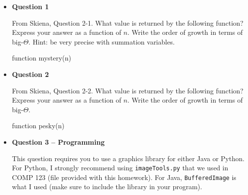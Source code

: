 \documentclass{article}
\begin{document}
\begin{itemize}
    \item\textbf{ Question 1}


          From Skiena, Question 2-1.  What value is returned by the following function?  Express your answer as a function of $n$.  Write the order of growth in terms of big-$\Theta$. Hint: be very precise with summation variables.

          \begin{algorithm}
              \begin{algorithmic}

                  \ENDFOR
                  \ENDFOR
                  \ENDFOR
              \end{algorithmic}
              \caption{function mystery(n) }
              \label{alg:algo}
          \end{algorithm}

    \item \textbf{Question 2}


          From Skiena, Question 2-2.  What value is returned by the following function?  Express your answer as a function of $n$.  Write the order of growth in terms of big-$\Theta$.
          \begin{algorithm}
              \begin{algorithmic}

                  \ENDFOR
                  \ENDFOR
                  \ENDFOR
              \end{algorithmic}
              \caption{function pesky(n) }
              \label{alg:algo}
          \end{algorithm}


    \item \textbf{Question 3 -- Programming}


          This question requires you to use a graphics library for either Java or Python.  For Python, I strongly recommend using \texttt{imageTools.py} that we used in COMP 123 (file provided with this homework).  For Java, \texttt{BufferedImage} is what I used (make sure to include the library in your program).



\end{itemize}
\end{document}
